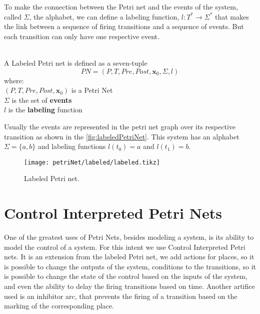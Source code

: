 To make the connection between the Petri net and the events of the system, called $\Sigma$, the alphabet, we can
define a labeling function, $l : T^* \rightarrow \Sigma^*$ that makes the link between a
sequence of firing transitions and a sequence of events. But each transition
can only have one respective event. 

\begin{definition}
  \label{def:petriNet}~\\
  A Labeled Petri net is defined as a seven-tuple
  \[PN = (P,T,Pre,Post,\mathbf{x}_0,\Sigma,l)\]
  where: \\
  \indent $(P,T,Pre,Post,\mathbf{x}_0)$ is a Petri Net\\
  \indent $\Sigma$ is the set of \textbf{events} \\
  \indent $l$ is the \textbf{labeling} function  \\
\end{definition}

Usually the events are represented in the petri net graph over its respective
transition as shown in the \autoref{fig:labeledPetriNet}. This system has an alphabet
$\Sigma=\{a,b\}$ and labeling functions $l(t_0)=a$ and $l(t_1)=b$.

\begin{figure}[H]
  \centering
  \texttt{[image: petriNet/labeled/labeled.tikz]}
  \caption{Labeled Petri net.}
  \label{fig:labeledPetriNet}
\end{figure}

\section{Control Interpreted Petri Nets}
\label{sec:cipn}
One of the greatest uses of Petri Nets, besides modeling a system, is its
ability to model the control of a system. For this intent we use Control Interpreted Petri nets. It is an
extension from the labeled Petri net, we add actions for places, so it is
possible to change the outputs of the system, conditions to the transitions, so it
is possible to change the state of the control based on the inputs of the
system, and even the ability to delay the firing transitions based on time.
Another artifice used is an inhibitor arc, that prevents the firing of a
transition based on the marking of the corresponding place.

